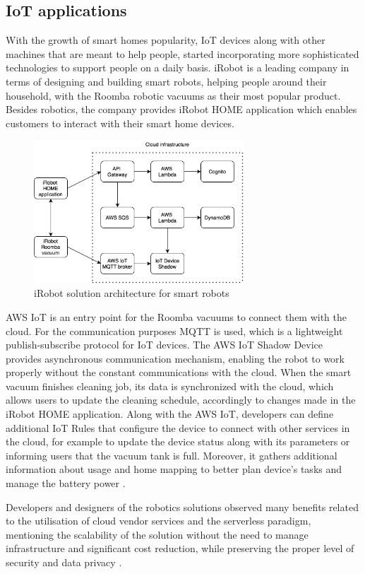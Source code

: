 \subsection{IoT applications}

With the growth of smart homes popularity, IoT devices along with other machines that are meant to help people, started incorporating more sophisticated technologies to support people on a daily basis. iRobot is a leading company in terms of designing and building smart robots, helping people around their household, with the Roomba robotic vacuums as their most popular product. Besides robotics, the company provides iRobot HOME application which enables customers to interact with their smart home devices.

\begin{figure}[h]
    \centering
    \includegraphics[width=0.7\textwidth]{assets/02-serverless/iRobotArchitecture.png}
    \caption{iRobot solution architecture for smart robots}
    \label{fig:irobot-architecture-diagram}
\end{figure}

AWS IoT is an entry point for the Roomba vacuums to connect them with the cloud. For the communication purposes MQTT is used, which is a lightweight publish-subscribe protocol for IoT devices. The AWS IoT Shadow Device provides asynchronous communication mechanism, enabling the robot to work properly without the constant communications with the cloud. When the smart vacuum finishes cleaning job, its data is synchronized with the cloud, which allows users to update the cleaning schedule, accordingly to changes made in the iRobot HOME application. Along with the AWS IoT, developers can define additional IoT Rules that configure the device to connect with other services in the cloud, for example to update the device status along with its parameters or informing users that the vacuum tank is full. Moreover, it gathers additional information about usage and home mapping to better plan device's tasks and manage the battery power \cite{ServerlessIoTatiRobot}.

Developers and designers of the robotics solutions observed many benefits related to the utilisation of cloud vendor services and the serverless paradigm, mentioning the scalability of the solution without the need to manage infrastructure and significant cost reduction, while preserving the proper level of security and data privacy \cite{AWSIRobotIoT}.
